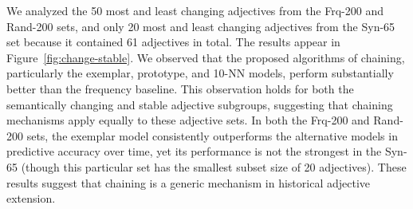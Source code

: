 \documentclass[output=paper]{langsci/langscibook}
\begin{document}
We analyzed the 50 most and least changing adjectives from the {\sc Frq-200} and {\sc Rand-200} sets, and only 20 most and least changing adjectives from the {\sc Syn-65} set because it contained 61 adjectives in total. The results appear in Figure~\ref{fig:change-stable}. We observed that the proposed algorithms of chaining, particularly the exemplar, prototype, and 10-NN models, perform substantially better than the frequency baseline. This observation holds for both the semantically changing and stable adjective subgroups, suggesting that chaining mechanisms apply equally to these adjective sets. In both the {\sc Frq-200} and {\sc Rand-200} sets, the exemplar model consistently outperforms the alternative models in predictive accuracy over time, yet its performance is not the strongest in the {\sc Syn-65} (though this particular set has the smallest subset size of 20 adjectives). These results suggest that chaining is a generic mechanism in historical adjective extension.
\end{document}
